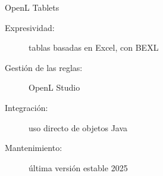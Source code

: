 \documentclass[10pt]{beamer}
\begin{document}
\begin{frame}{OpenL Tablets}
    \begin{description}
        \item [Expresividad:] tablas basadas en Excel, con BEXL
        \item [Gestión de las reglas:] OpenL Studio
        \item [Integración:] uso directo de objetos Java
        \item [Mantenimiento:] última versión estable 2025
    \end{description}
\end{frame}
\begin{comment}
Con OpenL Tablets, la especificación de las reglas se hace haciendo uso de tablas basadas en excel. Las expresiones en estas tablas utilizan BEXL, que es una extensión de Java.

La gestión de las reglas puede ser realizada con OpenL Studio, que es una aplicación web que permite realizar la gestión, versionado y control de acceso a las reglas. Las mismas se almacenan en docuemnto Excel, y sus cambios pueden hacerse efectivos sin necesidad de volver a compilar o desplegar el sistema.

Las reglas pueden hacer uso directo de objetos, clases y paquetes de Java.

OpenL Tablets continúa activamente en desarrollo, su última versión lanzada en 2025 y al igual que Drools la última actualización de la rama principal del repositorio tiene menos de una semana.
\end{comment}





\end{document}
